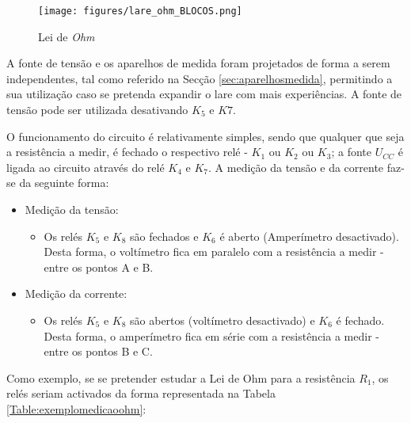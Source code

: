 \begin{figure}[hbtp]
	\centering
	\texttt{[image: figures/lare\_ohm\_BLOCOS.png]}
	\caption{ Lei de \textit{Ohm}}
	\label{fig:Implementacaoleideohm}
\end{figure}

A fonte de tensão e os aparelhos de medida foram projetados de forma a serem independentes, tal como referido na Secção \ref{sec:aparelhosmedida}, permitindo a sua utilização caso se pretenda expandir o \acrshort{lare} com mais experiências. A fonte de tensão pode ser utilizada desativando $K_{5}$ e $K7$. 

O funcionamento do circuito é relativamente simples, sendo que qualquer que seja a resistência a medir, é fechado o respectivo relé - $K_{1}$ ou $K_{2}$ ou $K_{3}$; a fonte $U_{CC}$ é ligada ao circuito através do relé $K_{4}$ e $K_{7}$. A medição da tensão e da corrente faz-se da seguinte forma:

\begin{itemize}
	\item Medição da tensão:
	      \begin{itemize}
		      \item Os relés $K_{5}$ e $K_{8}$ são fechados e $K_{6}$ é aberto (Amperímetro desactivado). Desta forma, o voltímetro fica em paralelo com a resistência a medir - entre os pontos A e B.
	      \end{itemize}
	\item Medição da corrente:
	      \begin{itemize}
		      \item Os relés $K_{5}$ e $K_{8}$ são abertos (voltímetro desactivado) e $K_{6}$ é fechado. Desta forma, o amperímetro fica em série com a resistência a medir - entre os pontos B e C.
	      \end{itemize}
\end{itemize}


Como exemplo, se se pretender estudar a Lei de Ohm para a resistência $R_{1}$, os relés seriam activados da forma representada na Tabela \ref{Table:exemplomedicaoohm}:

